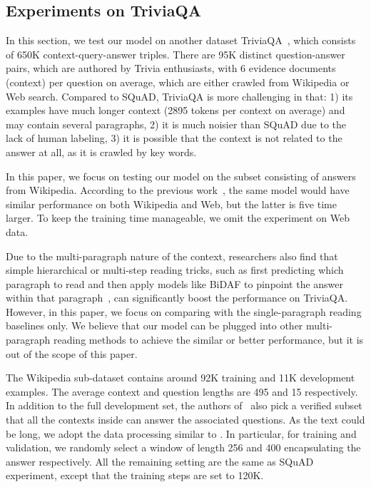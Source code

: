 \documentclass{article} \usepackage{iclr2018_conference,times}
\begin{document}
\subsection{Experiments on TriviaQA}
In this section, we test our model on another dataset TriviaQA~\citep{JoshiCWZ17},
which consists of 650K context-query-answer
triples. There are 95K distinct question-answer pairs, which are authored by 
Trivia enthusiasts, with 6 evidence documents (context)
per question on average, which are either crawled from Wikipedia or Web search.
Compared to SQuAD, TriviaQA is more challenging in that: 1) its examples have much longer context (2895 tokens per context on average) and may contain several paragraphs, 2) it is much noisier than SQuAD due to the lack of human labeling, 3) it is possible that the context is not related to the answer at all, as it is crawled by key words. 

In this paper, we focus on testing our model on the subset consisting of answers from Wikipedia. According to the previous work~\citep{JoshiCWZ17,HuPQ17,PanLZCCH17}, the same model would have similar performance on both Wikipedia and Web, but the latter is five time larger. To keep the training time manageable, we omit the experiment on Web data. 

Due to the multi-paragraph nature of the context, researchers also find that simple hierarchical or multi-step reading tricks, such as first predicting which paragraph to read and then apply models like BiDAF to pinpoint the answer within that paragraph~\citep{ClarkG17}, can significantly boost the performance on TriviaQA. However, in this paper, we focus on comparing with the single-paragraph reading baselines only. We believe that our model can be plugged into other multi-paragraph reading methods to achieve the similar or better performance, but it is out of the scope of this paper.

The Wikipedia sub-dataset contains around 92K training and 11K development examples. The average context and question lengths are 495 and 15 respectively. In addition to the full development set, the authors of~\cite{JoshiCWZ17} also pick a verified subset that all the contexts inside can answer the associated questions.  As the text could be long, we adopt the data processing similar to \cite{HuPQ17,JoshiCWZ17}. In particular, for training and validation, we randomly select a window of length 256 and 400 encapsulating the answer respectively. All the remaining setting are the same as SQuAD experiment, except that the training steps are set to 120K.
\end{document}

